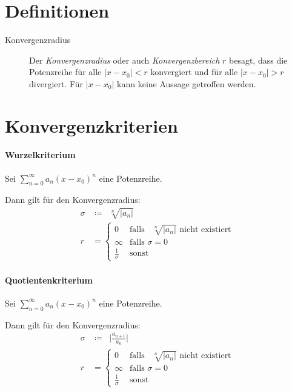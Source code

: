 \documentclass[a4paper, 11pt, accentcolor = tud3b]{tudreport}
\DeclareMathOperator{\liminfty}{\lim _ { n \rightarrow \infty }}
\begin{document}
        \section{Definitionen}
            \begin{description}
                \item[Konvergenzradius] Der \textit{Konvergenzradius} oder auch \textit{Konvergenzbereich} $ r $ besagt, dass die Potenzreihe für alle $ \lvert x - x _ 0 \rvert < r $ konvergiert und für alle $ \lvert x - x _ 0 \rvert > r $ divergiert. Für $ \lvert x - x _ 0 \rvert $ kann keine Aussage getroffen werden.
            \end{description}

        \section{Konvergenzkriterien}
            \paragraph{Wurzelkriterium}
                Sei $ \sum _ { n = 0 } ^ \infty a _ n (x - x _ 0) ^ n $ eine Potenzreihe.

                Dann gilt für den Konvergenzradius:
                \begin{align*}
                    \sigma &\coloneqq \liminfty \sqrt[n]{\lvert a _ n \rvert} \\
                    r &=
                    \begin{cases}
                        0 & \text{falls } \liminfty \sqrt[n]{\lvert a _ n \rvert} \text{ nicht existiert} \\
                        \infty & \text{falls } \sigma = 0 \\
                        \frac{1}{\sigma} & \text{sonst}
                    \end{cases}
                \end{align*}

            \paragraph{Quotientenkriterium}
                Sei $ \sum _ { n = 0 } ^ \infty a _ n (x - x _ 0) ^ n $ eine Potenzreihe.

                Dann gilt für den Konvergenzradius:
                \begin{align*}
                    \sigma &\coloneqq \liminfty \lvert \frac{a _ { n + 1 }}{a _ n} \rvert \\
                    r &=
                    \begin{cases}
                        0 & \text{falls } \liminfty \sqrt[n]{\lvert a _ n \rvert} \text{ nicht existiert} \\
                        \infty & \text{falls } \sigma = 0 \\
                        \frac{1}{\sigma} & \text{sonst}
                    \end{cases}
                \end{align*}
\end{document}
